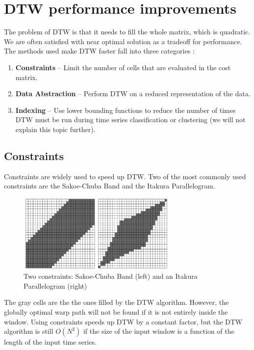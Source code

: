 \section{DTW performance improvements}

The problem of DTW is that it needs to fill the whole matrix, which is quadratic. We are often
satisfied with near optimal solution as a tradeoff for performance. The methods used make DTW
faster fall into three categories \cite{toward_accurate__dtw}:

\begin{enumerate}
  \item \textbf{Constraints} – Limit the number of cells that are
  evaluated in the cost matrix.
  \item  \textbf{Data Abstraction} – Perform DTW on a reduced
  representation of the data.
  \item  \textbf{Indexing} – Use lower bounding functions to reduce the number of times DTW must be
  run during time series classification or clustering (we will not explain this topic further).
\end{enumerate}

\subsection{Constraints}

Constraints are widely used to speed up DTW. Two of the most commonly used constraints are the
Sakoe-Chuba Band and the Itakura Parallelogram.

\begin{figure}[H]
  \centerline{\includegraphics[width=0.7\textwidth]{images/constraints.png}}
  \caption[Two constraints: Sakoe-Chuba Band (left) and an Itakura Parallelogram (right)]{Two
    constraints: Sakoe-Chuba Band (left) and an Itakura Parallelogram (right)}
  \label{obr:constraints}
\end{figure}

The gray cells are the the ones filled by the DTW algorithm. However, the globally optimal warp path
will not be found if it is not entirely inside the window. Using constraints speeds up DTW by a
constant factor, but the DTW algorithm is still $O(N^2)$ if the size of the input window is a
function of the length of the input time series.

